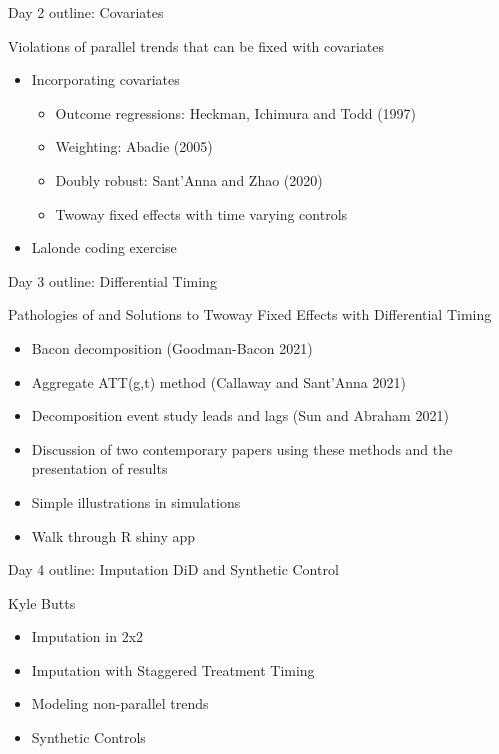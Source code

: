 \documentclass{beamer}
\begin{document}
\begin{frame}{Day 2 outline: Covariates}

Violations of parallel trends that can be fixed with covariates
	\begin{itemize}
	\item Incorporating covariates
		\begin{itemize}
		\item Outcome regressions: Heckman, Ichimura and Todd (1997)
		\item Weighting: Abadie (2005)
		\item Doubly robust: Sant’Anna and Zhao (2020)
		\item Twoway fixed effects with time varying controls	
		\end{itemize}
	\item Lalonde coding exercise
	\end{itemize}

\end{frame}

\begin{frame}{Day 3 outline: Differential Timing}

Pathologies of and Solutions to Twoway Fixed Effects with Differential Timing
	\begin{itemize}
	\item Bacon decomposition (Goodman-Bacon 2021)
	\item Aggregate ATT(g,t) method (Callaway and Sant’Anna 2021)
	\item Decomposition event study leads and lags (Sun and Abraham 2021)
	\item Discussion of two contemporary papers using these methods and the presentation of results
	\item Simple illustrations in simulations
	\item Walk through R shiny app
	\end{itemize}

\end{frame}


\begin{frame}{Day 4 outline: Imputation DiD and Synthetic Control}

Kyle Butts

\begin{itemize}
\item Imputation in 2x2
\item Imputation with Staggered Treatment Timing
\item Modeling non-parallel trends
\item Synthetic Controls
\end{itemize}

\end{frame}
\end{document}
